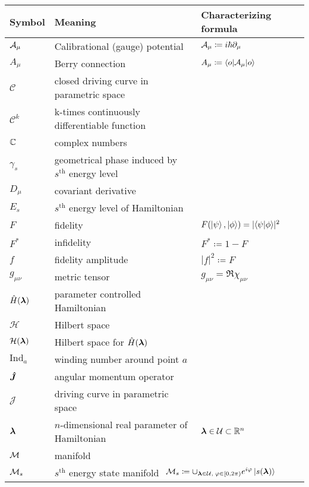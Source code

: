 

\vspace{-0pt}\begin{tabular} {@{}C{1.9cm}@{}p{8cm}@{}C{3.77cm}}
	\toprule
	\textbf{Symbol}& \textbf{Meaning}& \hspace{-30pt}\textbf{Characterizing formula}\\\bottomrule
	$\mathcal{A}_\mu$ & Calibrational (gauge) potential & $\mathcal{A}_\mu\coloneqq i\hbar \partial_\mu$ \\
	$A_\mu$ & Berry connection & $A_\mu\coloneqq \braket{o|\mathcal{A}_\mu|o}$ \\
	$\mathcal C$ & closed driving curve in parametric space &  \\
	$\mathcal{C}^k$ & k-times continuously differentiable function \\
	$\mathbb{C}$ & complex numbers & \\
	  $\gamma_s$& geometrical phase induced by $s^{\text{th}}$ energy level &  \\
	  $D_\mu$&covariant derivative  &  \\
	  $E_s$&$s^{\text{th}}$ energy level of Hamiltonian &  \\
	  $F$& fidelity & \hspace{-7pt}$F(\ket{\psi},\ket{\phi})=|\!\braket{\psi|\phi}\!|^2$  \\
	  $F^*$& infidelity & $F^*\coloneqq 1-F$  \\
	  $f$& fidelity amplitude  & $|f|^2\coloneqq F$  \\
	  $g_{\mu\nu}$& metric tensor& $g_{\mu\nu}= \Re\chi_{\mu\nu}$ \\
	  $\hat{H}({\bm\lambda})$& parameter controlled Hamiltonian  &  \\ 
	  $\mathcal H$& Hilbert space  &  \\ 
	  $\mathcal H({\bm\lambda})$& Hilbert space for $\hat{H}({\bm\lambda})$ &  \\ 
	  $\mathrm{Ind}_a$ & winding number around point $a$ & \\
	  $\bm{\hat{J}}$ & angular momentum operator & \\
	  $\mathcal J$ & driving curve in parametric space &  \\
	  ${\bm\lambda}$& $n$-dimensional real parameter of Hamiltonian &${\bm\lambda}\in \mathcal U\subset \mathbb{R}^n$  \\
	  $\mathcal{M}$& manifold &  \\
	  $\mathcal{M}_s$& $s^{\text{th}}$ energy state manifold & $\hspace{-43pt}\M_s\coloneqq\cup_{\llambda\in\mathcal U,\;\varphi\in[0,2\pi)} e^{i\varphi}\ket{s(\llambda)}$ \\

\end{tabular}

